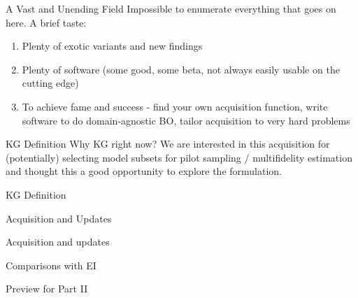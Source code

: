 \documentclass[usenames,dvipsnames]{beamer}
\theoremstyle{definition}
\begin{document}
\begin{frame}{A Vast and Unending Field}
Impossible to enumerate everything that goes on here. A brief taste: 
\begin{enumerate}
    \item Plenty of exotic variants and new findings 
    


    \item Plenty of software (some good, some beta, not always easily usable on the cutting edge)



    \item To achieve fame and success - find your own acquisition function, write software to do domain-agnostic BO, tailor acquisition to very hard problems
\end{enumerate}
    
\end{frame}

\begin{frame}{KG Definition}
Why KG right now? We are interested in this acquisition for (potentially) selecting model subsets for pilot sampling / multifidelity estimation and thought this a good opportunity to explore the formulation.


\end{frame}

\begin{frame}{KG Definition}
    
\end{frame}

\begin{frame}{Acquisition and Updates}
    
\end{frame}

\begin{frame}{Acquisition and updates}


\end{frame}

\begin{frame}{Comparisons with EI}
    
\end{frame}

\begin{frame}{Preview for Part II}

\end{frame}

\end{document}
